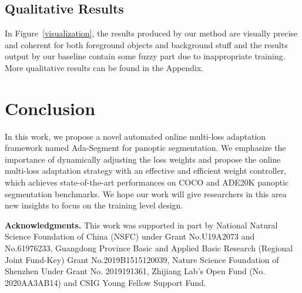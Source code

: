 \documentclass[letterpaper]{article} \usepackage{aaai21}  \usepackage{times}  \usepackage{helvet} \usepackage{courier}  \usepackage[hyphens]{url}  \usepackage{graphicx} \urlstyle{rm} \def\UrlFont{\rm}  \usepackage{natbib}  \usepackage{caption} \frenchspacing  \setlength{\pdfpagewidth}{8.5in}  \setlength{\pdfpageheight}{11in}
\begin{document}
 \subsection{Qualitative Results}
In Figure~\ref{visualization}, the results produced by our method are visually precise and coherent
 for both foreground objects and background stuff and the results output by our baseline contain 
 some fuzzy part due to inappropriate training. 
 More qualitative results can be found in the Appendix.
 



 \section{Conclusion}
 In this work, we propose a novel automated online multi-loss adaptation framework named Ada-Segment 
 for panoptic segmentation. We emphasize the importance of dynamically adjusting 
 the loss weights and propose the online multi-loss adaptation strategy with an effective 
 and efficient weight controller, which achieves state-of-the-art performances
 on COCO and ADE20K panoptic segmentation benchmarks. 
 We hope our work will give researchers in this area new insights to focus on the training level design. 


\textbf{Acknowledgments.} 
This work was supported in part by National Natural Science Foundation of China (NSFC) under Grant No.U19A2073 and No.61976233, Guangdong Province Basic and Applied Basic Research (Regional Joint Fund-Key) Grant No.2019B1515120039, Nature Science Foundation of Shenzhen Under Grant No. 2019191361, Zhijiang Lab’s Open Fund (No. 2020AA3AB14) and CSIG Young Fellow Support Fund.  


\end{document}
